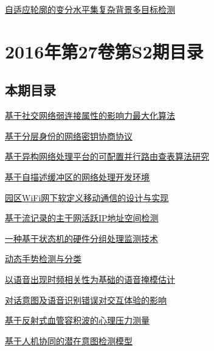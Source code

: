 \documentclass[a4paper]{article}
\begin{document}
\href{http://www.jos.org.cn/ch/reader/create_pdf.aspx?file_no=5172&year_id=2017&quarter_id=10&falg=1}{自适应轮廓的变分水平集复杂背景多目标检测}


\section{\textbf{2016年第27卷第S2期目录}}
\subsection{本期目录}
\href{http://www.jos.org.cn/ch/reader/create_pdf.aspx?file_no=16012&year_id=2016&quarter_id=S2&falg=1}{基于社交网络弱连接属性的影响力最大化算法}

\href{http://www.jos.org.cn/ch/reader/create_pdf.aspx?file_no=16013&year_id=2016&quarter_id=S2&falg=1}{基于分层身份的网络密钥协商协议}

\href{http://www.jos.org.cn/ch/reader/create_pdf.aspx?file_no=16014&year_id=2016&quarter_id=S2&falg=1}{基于异构网络处理平台的可配置并行路由查表算法研究}

\href{http://www.jos.org.cn/ch/reader/create_pdf.aspx?file_no=16015&year_id=2016&quarter_id=S2&falg=1}{基于自描述缓冲区的网络处理开发环境}

\href{http://www.jos.org.cn/ch/reader/create_pdf.aspx?file_no=16016&year_id=2016&quarter_id=S2&falg=1}{园区WiFi网下软定义移动通信的设计与实现}

\href{http://www.jos.org.cn/ch/reader/create_pdf.aspx?file_no=16017&year_id=2016&quarter_id=S2&falg=1}{基于流记录的主干网活跃IP地址空间检测}

\href{http://www.jos.org.cn/ch/reader/create_pdf.aspx?file_no=16018&year_id=2016&quarter_id=S2&falg=1}{一种基于状态机的硬件分组处理监测技术}

\href{http://www.jos.org.cn/ch/reader/create_pdf.aspx?file_no=16019&year_id=2016&quarter_id=S2&falg=1}{动态手势检测与分类}

\href{http://www.jos.org.cn/ch/reader/create_pdf.aspx?file_no=16020&year_id=2016&quarter_id=S2&falg=1}{以语音出现时频相关性为基础的语音掩模估计}

\href{http://www.jos.org.cn/ch/reader/create_pdf.aspx?file_no=16021&year_id=2016&quarter_id=S2&falg=1}{对话意图及语音识别错误对交互体验的影响}

\href{http://www.jos.org.cn/ch/reader/create_pdf.aspx?file_no=16022&year_id=2016&quarter_id=S2&falg=1}{基于反射式血管容积波的心理压力测量}

\href{http://www.jos.org.cn/ch/reader/create_pdf.aspx?file_no=16023&year_id=2016&quarter_id=S2&falg=1}{基于人机协同的潜在意图检测模型}
\end{document}
